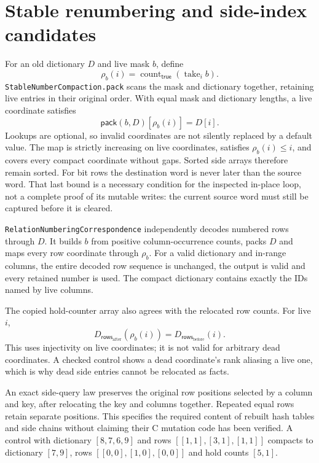 \documentclass[11pt,a4paper]{article}
\newcommand{\code}[1]{\nolinkurl{#1}}
\begin{document}
\section{Stable renumbering and side-index candidates}

For an old dictionary $D$ and live mask $b$, define
\[
 \rho_b(i)=\operatorname{count}_{\mathsf{true}}(\operatorname{take}_i b).
\]
\code{StableNumberCompaction.pack} scans the mask and dictionary together,
retaining live entries in their original order. With equal mask and dictionary
lengths, a live coordinate satisfies
\[
 \mathsf{pack}(b,D)[\rho_b(i)]=D[i].
\]
Lookups are optional, so invalid coordinates are not silently replaced by a
default value. The map is strictly increasing on live coordinates, satisfies
$\rho_b(i)\leq i$, and covers every compact coordinate without gaps. Sorted
side arrays therefore remain sorted. For bit rows the destination word is
never later than the source word. That last bound is a necessary condition
for the inspected in-place loop, not a complete proof of its mutable writes:
the current source word must still be captured before it is cleared.

\code{RelationNumberingCorrespondence} independently decodes numbered rows
through $D$. It builds $b$ from positive column-occurrence counts, packs $D$
and maps every row coordinate through $\rho_b$. For a valid dictionary and
in-range columns, the entire decoded row sequence is unchanged, the output
is valid and every retained number is used. The compact dictionary contains
exactly the IDs named by live columns.

The copied hold-counter array also agrees with the relocated row counts.
For live $i$,
\[
 D_{\mathsf{rows}_{\mathrm{after}}}(\rho_b(i))
   =D_{\mathsf{rows}_{\mathrm{before}}}(i).
\]
This uses injectivity on live coordinates; it is not valid for arbitrary
dead coordinates. A checked control shows a dead coordinate's rank aliasing
a live one, which is why dead side entries cannot be relocated as facts.

An exact side-query law preserves the original row positions selected by a
column and key, after relocating the key and columns together. Repeated
equal rows retain separate positions. This specifies the required content
of rebuilt hash tables and side chains without claiming their C mutation
code has been verified. A control with dictionary $[8,7,6,9]$ and rows
$[[1,1],[3,1],[1,1]]$ compacts to dictionary $[7,9]$, rows
$[[0,0],[1,0],[0,0]]$ and hold counts $[5,1]$.
\end{document}
